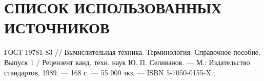 \section*{СПИСОК ИСПОЛЬЗОВАННЫХ ИСТОЧНИКОВ}

\begingroup
\renewcommand{\section}[2]{}
\begin{thebibliography}{}
	 ГОСТ 19781-83 // Вычислительная техника. Терминология: Справочное пособие. Выпуск 1 / Рецензент канд. техн. наук Ю. П. Селиванов. — М.: Издательство стандартов, 1989. — 168 с. — 55 000 экз. — ISBN 5-7050-0155-X.;
\end{thebibliography}
\endgroup

\pagebreak
